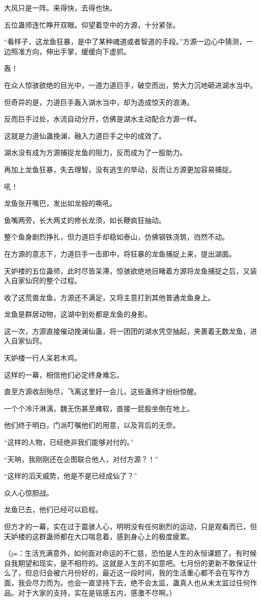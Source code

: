 \begin{this_body}
大风只是一阵。来得快，去得也快。

五位蛊师连忙睁开双眼。仰望着空中的方源，十分紧张。

“看样子，这龙鱼狂暴，是中了某种魂道或者智道的手段。”方源一边心中猜测，一边照准方向，伸出手掌，缓缓向下虚抓。

轰！

在众人惊骇欲绝的目光中，一道力道巨手，破空而出，势大力沉地砸进湖水当中。

但奇异的是，力道巨手轰入湖水当中，却为造成惊天的浪涛。

反而巨手过处，水流自动分开，仿佛是湖水主动配合方源一样。

这就是力道仙蛊挽澜，融入力道巨手之中的成效了。

湖水没有成为方源捕捉龙鱼的阻力，反而成为了一股助力。

再加上龙鱼狂暴，失去理智，没有逃生的举动，反而让方源更加容易捕捉。

吼！

龙鱼张开嘴巴，发出如龙般的嘶吼。

鱼嘴两旁，长大两丈的修长龙须，如长鞭疯狂抽动。

整个鱼身剧烈挣扎，但力道巨手却稳如泰山，仿佛钢铁浇筑，岿然不动。

在方源的意志下，力道巨手一击即中，将狂暴的龙鱼捕捉上来，提出湖面。

天妒楼的五位蛊师，此时尽皆呆滞，惊骇欲绝地目睹着方源将龙鱼捕捉之后，又装入自家仙窍的整个过程。

收了这荒兽龙鱼，方源还不满足，又将主意打到其他普通龙鱼身上。

龙鱼是群居动物，这湖中到处都是龙鱼的身影。

这一次，方源直接催动挽澜仙蛊，将一团团的湖水凭空抽起，夹裹着无数龙鱼，进入自家仙窍。

天妒楼一行人呆若木鸡。

这样的一幕，相信他们必定终身难忘。

直至方源收刮殆尽，飞离这里好一会儿，这些蛊师才纷纷惊醒。

一个个冷汗淋漓，魏无伤甚至瘫软，直接一屁股坐倒在地上。

他们终于明白，门派叮嘱他们的用意，以及背后的无奈。

“这样的人物，已经绝非我们能够对付的。”

“天呐，我刚刚还在企图联合他人，对付方源？！”

“这样的滔天威势，他是不是已经成仙了？”

众人心惊胆战。

龙鱼已去，他们已经可以启程。

但方才的一幕，实在过于震骇人心，明明没有任何剧烈的运动，只是观看而已，但天妒楼的这群蛊师都在大口喘息着，感到身心上的极度疲累。

（ps：生活充满意外，如何面对命运的不仁慈，恐怕是人生的永恒课题了。有时候自我期望和现实，是不相符的。这就是人生的不如意吧。七月份的更新不敢保证什么了，但总归会被六月份好的，最近这一段时间，我的生活重心都不会在写作方面，我会尽力而为。也会一直坚持下去，绝不会太监，蛊真人也从未太监过任何作品。对于大家的支持，实在是铭感五内，感激不尽啊。）

\end{this_body}

